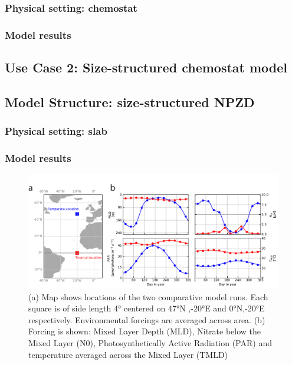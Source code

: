 \documentclass[journal abbreviation, manuscript]{copernicus}
\begin{document}
\subsubsection{Physical setting: chemostat}


\subsubsection{Model results}


\subsection{Use Case 2: Size-structured chemostat model}

\subsection{Model Structure: size-structured NPZD}



\subsubsection{Physical setting: slab}

\subsubsection{Model results}


\clearpage

\begin{figure}[t]
\includegraphics[width=15cm]{Figures/firstdraft_plots/01_forcing_labeled.pdf}
\caption{(a) Map shows locations of the two comparative model runs. Each square is of side length 4° centered on 47°N ,-20°E and 0°N,-20°E respectively. Environmental forcings are averaged across area. (b) Forcing is shown: Mixed Layer Depth (MLD), Nitrate below the Mixed Layer (N0),
Photosynthetically Active Radiation (PAR) and temperature averaged across the Mixed Layer (TMLD)}
\label{phydraforcing}
\end{figure}
\end{document}
